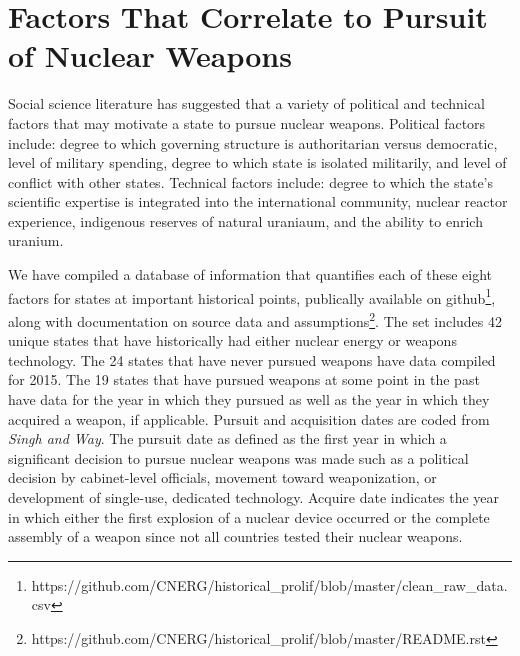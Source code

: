 \section{Factors That Correlate to Pursuit of Nuclear Weapons}
\label{s_factors}

Social science literature has suggested that a variety of political and technical factors that may motivate a state to pursue nuclear weapons\cite{bell_questioning_2013, singh_correlates_2004, montgomery_perils_2009, li_model-based_2010}. Political factors include: degree to which governing structure is authoritarian versus democratic, level of military spending, degree to which state is isolated militarily, and level of conflict with other states. Technical factors include: degree to which the state's scientific expertise is integrated into the international community\cite{hymans_achieving_2012}, nuclear reactor experience, indigenous reserves of natural uraniaum, and the ability to enrich uranium.

We have compiled a database of information that quantifies each of these eight factors for states at important historical points, publically available on github\footnote{https://github.com/CNERG/historical\_prolif/blob/master/clean\_raw\_data.csv}, along with documentation on source data and assumptions\footnote{https://github.com/CNERG/historical\_prolif/blob/master/README.rst}.  The set includes 42 unique states that have historically had either nuclear energy or weapons technology.  The 24 states that have never pursued weapons have data compiled for 2015. The 19 states that have pursued weapons at some point in the past have data for the year in which they pursued as well as the year in which they acquired a weapon, if applicable. Pursuit and acquisition dates are coded from \emph{Singh and Way}. The pursuit date as defined as the first year in which a significant decision to pursue nuclear weapons was made such as a political decision by cabinet-level officials, movement toward weaponization, or development of single-use, dedicated technology.  Acquire date indicates the year in which either the first explosion of a nuclear device occurred or the complete assembly of a weapon since not all countries tested their nuclear weapons.

